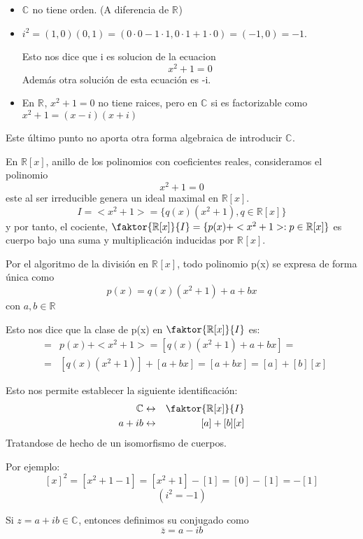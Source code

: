 \begin{itemize}
  \item \( \mathbb{C}^{}\) no tiene orden. (A diferencia de \(\mathbb{R}^{}\))
  \item \(i^2 = (1,0)(0,1) = (0 \cdot 0-1 \cdot 1, 0 \cdot 1+1 \cdot 0) = (-1,0) = -1 \).
   
    Esto nos dice que i es solucion de la ecuacion
    \begin{equation*}
      x^2+1=0
    \end{equation*}
    Además otra solución de esta ecuación es -i.

  \item En \(\mathbb{R}^{}\), \(x^2+1=0 \) no tiene raices, pero en \(\mathbb{C}^{}\) si es factorizable como \(x^2+1= (x-i)(x+i)\)
\end{itemize}

Este último punto no aporta otra forma algebraica de introducir \(\mathbb{C}^{}\).

En \(\mathbb{R}[x]\), anillo de los polinomios con coeficientes reales, consideramos el polinomio
\[x^2+1=0\]
este al ser irreducible genera un ideal maximal en  \(\mathbb{R}[x]\).
\[ I = <x^2+1> = \{q(x)(x^2+1), q \in \mathbb{R}[x]\}\]
y por tanto, el cociente, \(\faktor{\mathbb{R}[x]}{I} = \{p(x)+<x^2+1> : p \in \mathbb{R}[x]\}\) es cuerpo bajo una suma y multiplicación inducidas por \(\mathbb{R}^{}[x]\).

Por el algoritmo de la división en \(\mathbb{R}^{}[x]\), todo polinomio p(x) se expresa de forma única como
\[p(x) = q(x)(x^2+1) + a +bx\]
con \(a,b \in \mathbb{R}^{}\)

Esto nos dice que la clase de p(x) en \(\faktor{\mathbb{R}[x]}{I}\) es:
\begin{eqnarray*}
  [p(x)] & = & p(x) + <x^2+1> = [q(x)(x^2+1)+a+bx] = \\
         & = & [q(x)(x^2+1)] + [a+bx] = [a+bx] = [a]+[b][x]
\end{eqnarray*}

Esto nos permite establecer la siguiente identificación:
\begin{eqnarray*}
  \mathbb{C} & \leftrightarrow & \faktor{\mathbb{R}[x]}{I} \\
        a+ib & \leftrightarrow & [a]+[b][x]
\end{eqnarray*}
Tratandose de hecho de un isomorfismo de cuerpos.

Por ejemplo:
\[[x]^2=[x^2+1-1]=[x^2+1]-[1] = [0] - [1] = -[1]\]
\[(i^2 = -1)\]

\begin{definicion}
  Si \(z = a+ib \in \mathbb{C}^{}\), entonces definimos su conjugado como
  \[ \overline{z} = a-ib\]
\end{definicion}

